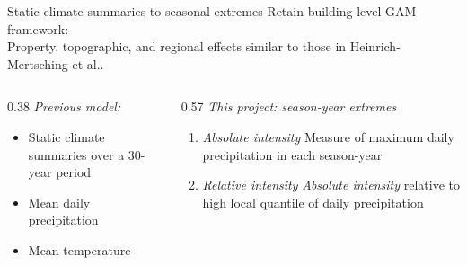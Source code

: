 \begin{frame}{Static climate summaries to seasonal extremes}
  \vspace{0.5cm}
  \footnotesize
  Retain building-level GAM framework:\\
  Property, topographic, and regional effects similar to those in
  Heinrich-Mertsching et al..

  \vspace{0.5cm}
  \begin{columns}[T,onlytextwidth]
    \begin{column}{0.38\textwidth}
      \textit{Previous model:}
      \begin{itemize}
        \item Static climate summaries over a 30-year period
        \item Mean daily precipitation
        \item Mean temperature
      \end{itemize}
    \end{column}
    \begin{column}{0.57\textwidth}
      \textit{This project: season-year extremes}
      \begin{enumerate}
        \item \textit{Absolute intensity}\newline
          Measure of maximum daily precipitation in each season-year
        \item \textit{Relative intensity}\newline
          \textit{Absolute intensity} relative to high local
          quantile of daily precipitation
      \end{enumerate}
    \end{column}
  \end{columns}
\end{frame}
